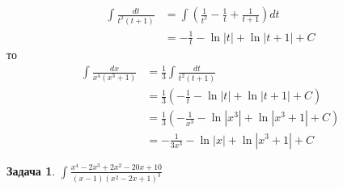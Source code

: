 \documentclass[12pt]{article}
\theoremstyle{neosn}
\newtheorem{problem}{Задача}
\begin{document}
\begin{align*}
    \int \frac{dt}{t^2(t+1)} &= \int (\frac{1}{t^2}-\frac{1}{t}+\frac{1}{t+1})dt\\
                            &= -\frac{1}{t}-\ln |t|+\ln |t+1| +C
\end{align*}
то 
\begin{align*}
    \int \frac{dx}{x^4(x^3+1)} &= \frac{1}{3} \int \frac{dt}{t^2(t+1)}\\
                                &= \frac{1}{3}(-\frac{1}{t}-\ln |t|+\ln |t+1|+C)\\
                                &=\frac{1}{3}(-\frac{1}{x^3}-\ln |x^3|+\ln |x^3+1|+C)\\
                                &=-\frac{1}{3x^3}-\ln |x| + \ln |x^3+1| +C
\end{align*}

\begin{problem}
    $\int \frac{x^4-2x^3+2x^2-20x+10}{(x-1)(x^2-2x+1)^3}$
\end{problem}
\end{document}
